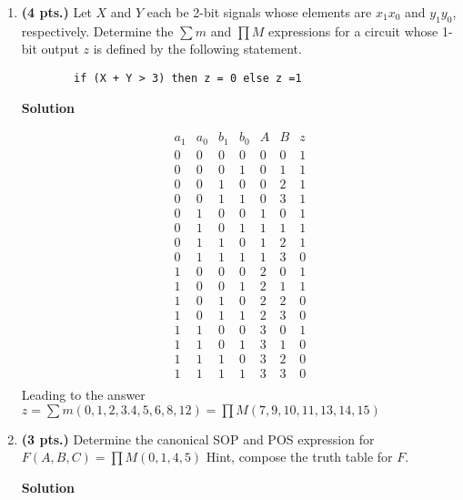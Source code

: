 \begin{enumerate}
\item \textbf{ (4 pts.)} Let $X$ and $Y$ each be 2-bit signals whose 
elements are $x_1 x_0$ and $y_1 y_0$, respectively.  Determine the 
$\sum m$ and $\prod M$ expressions for a circuit whose 1-bit
output $z$ is defined by the following statement.
\begin{verbatim}
        if (X + Y > 3) then z = 0 else z =1
\end{verbatim}

\begin{onlysolution}  \textbf{Solution} \itshape

$$\begin{array}{c|c|c|c||c|c||c}
a_1 & a_0 & b_1 & b_0 & A  & B & z  \\ \hline
0 & 0 & 0 & 0 & 0 & 0 & 1  \\ \hline
0 & 0 & 0 & 1 & 0 & 1 & 1  \\ \hline
0 & 0 & 1 & 0 & 0 & 2 & 1  \\ \hline
0 & 0 & 1 & 1 & 0 & 3 & 1  \\ \hline
0 & 1 & 0 & 0 & 1 & 0 & 1  \\ \hline
0 & 1 & 0 & 1 & 1 & 1 & 1  \\ \hline
0 & 1 & 1 & 0 & 1 & 2 & 1  \\ \hline
0 & 1 & 1 & 1 & 1 & 3 & 0  \\ \hline
1 & 0 & 0 & 0 & 2 & 0 & 1  \\ \hline
1 & 0 & 0 & 1 & 2 & 1 & 1  \\ \hline
1 & 0 & 1 & 0 & 2 & 2 & 0  \\ \hline
1 & 0 & 1 & 1 & 2 & 3 & 0  \\ \hline
1 & 1 & 0 & 0 & 3 & 0 & 1  \\ \hline
1 & 1 & 0 & 1 & 3 & 1 & 0  \\ \hline
1 & 1 & 1 & 0 & 3 & 2 & 0  \\ \hline
1 & 1 & 1 & 1 & 3 & 3 & 0  \\
\end{array}$$
Leading to the answer
$ z = \sum m(0,1,2,3.4,5,6,8,12) = \prod M(7,9,10,11,13,14,15)$
\end{onlysolution}

	

\item \textbf{ (3 pts.)} Determine the canonical SOP and POS expression for 
$F(A,B,C) = \prod M (0,1,4,5)$  Hint, compose the truth table for $F$.

\begin{onlysolution}  \textbf{Solution} \itshape


\end{onlysolution}
\end{enumerate}
